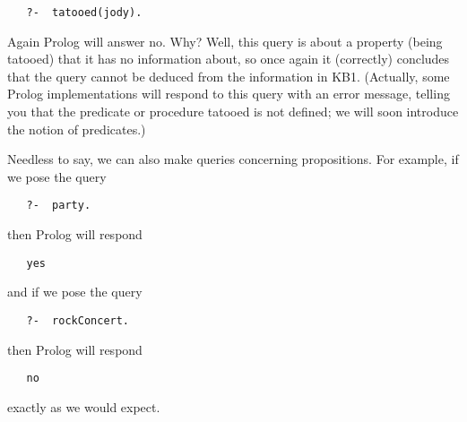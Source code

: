 \begin{verbatim} 
   ?-  tatooed(jody).
\end{verbatim}
   
Again Prolog will answer no. Why? Well, this query is about a property (being
tatooed) that it has no information about, so once again it (correctly)
concludes that the query cannot be deduced from the information in KB1.
(Actually, some Prolog implementations will respond to this query with an error
message, telling you that the predicate or procedure tatooed is not defined; we
will soon introduce the notion of predicates.)

Needless to say, we can also make queries concerning propositions. For example,
if we pose the query

\begin{verbatim} 
   ?-  party.
\end{verbatim}

then Prolog will respond

\begin{verbatim} 
   yes
\end{verbatim}

and if we pose the query

\begin{verbatim} 
   ?-  rockConcert.
\end{verbatim}

then Prolog will respond

\begin{verbatim} 
   no
\end{verbatim}

exactly as we would expect.
   
\secup
